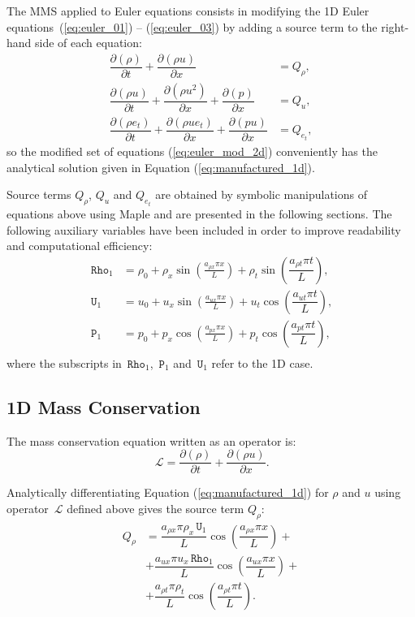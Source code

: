 \documentclass[10pt]{article}
\newcommand{\Diff}[2] {\dfrac{\partial( #1)}{\partial #2}}
\newcommand{\Rho}{\,\mathtt{Rho}}
\newcommand{\PP}{\,\mathtt{P}}
\newcommand{\U}{\,\mathtt{U}}
\newcommand{\Lo}{\,\mathcal{L}}
\begin{document}
The MMS applied to Euler equations consists in modifying the 1D Euler equations~(\ref{eq:euler_01}) -- (\ref{eq:euler_03}) by adding a source term to the right-hand side of each equation:
\begin{equation}
 \label{eq:euler_mod_2d}
\begin{split}
\Diff{\rho}{t} +\Diff{\rho u}{x} &= Q_\rho,\\
\Diff{\rho u}{t} + \Diff{\rho u^2 }{x}+ \Diff{p}{x} &= Q_u,\\
\Diff{\rho e_t}{t} +\Diff{\rho ue_t}{x}+ \Diff{pu}{x} &= Q_{e_t},
\end{split}
\end{equation}
%
so the modified set of equations (\ref{eq:euler_mod_2d}) conveniently has the analytical solution given in Equation (\ref{eq:manufactured_1d}).
%

Source terms $Q_\rho$, $Q_u$ and $Q_{e_t}$ are obtained by symbolic manipulations of equations above using Maple and are presented in the following sections. The following auxiliary variables have been included in order to improve readability and computational efficiency:
\begin{equation*}
 \begin{split}
\label{eq:aux_1d}
\Rho_1 &= \rho_{0}+ \rho_{x} \sin\left(\frac{a_{ \rho x} \pi x}{L}\right) + \rho_t \sin\left(\dfrac{a_{\rho t} \pi t}{L}\right),\\
\U_1 &= u_{0}+u_{x} \sin\left(\frac{a_{u x} \pi x}{L}\right) + u_t \cos\left(\dfrac{a_{u t} \pi t}{L}\right),\\
\PP_1 &= p_{0}+p_{x} \cos\left(\frac{a_{p x} \pi x}{L}\right)+ p_t \cos\left(\dfrac{a_{p t} \pi t}{L}\right),\\
\end{split}
\end{equation*}
where the subscripts in $\Rho_1$, $\PP_1$ and $\U_1$ refer to the 1D case.

\subsection{1D Mass Conservation}

The mass conservation equation written as an operator is:
\begin{equation*}
 \Lo=\Diff{\rho}{t} + \Diff{\rho u}{x}.
\end{equation*}

Analytically differentiating Equation (\ref{eq:manufactured_1d}) for $\rho$ and $u$  using operator $\Lo$ defined above gives  the source term $Q_{\rho}$:
\begin{equation}
 \begin{split}
Q_\rho &= \dfrac{a_{\rho x} \pi \rho_x \U_1}{L}\cos\left(\dfrac{a_{\rho x} \pi x}{L}\right) +\\
&+\dfrac{a_{ux} \pi u_x \Rho_1}{L}\cos\left(\dfrac{a_{ux} \pi x}{L}\right)+\\
&+  \dfrac{ a_{\rho t} \pi \rho_t}{L}\cos\left(\dfrac{a_{\rho t} \pi t}{L}\right) .
 \end{split}
\end{equation}
\end{document}

